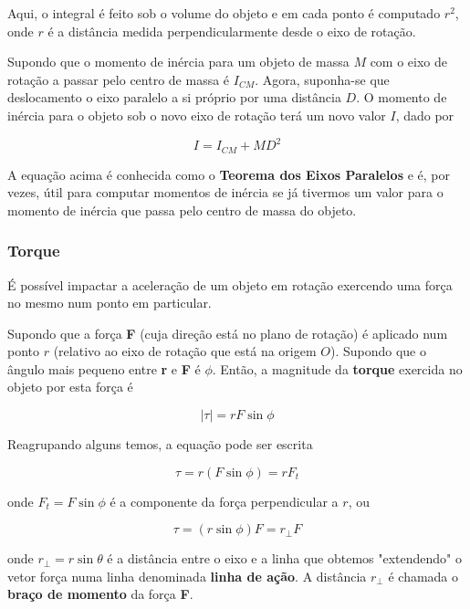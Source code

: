 Aqui, o integral é feito sob o volume do objeto e em cada ponto é computado $r^2$, onde $r$ é a distância medida perpendicularmente desde o eixo de rotação.

Supondo que o momento de inércia para um objeto de massa $M$ com o eixo de rotação a passar pelo centro de massa é $I_{CM}$. Agora, suponha-se que deslocamento o eixo paralelo a si próprio por uma distância $D$. O momento de inércia para o objeto sob o novo eixo de rotação terá um novo valor $I$, dado por

\begin{equation}
    I=I_{CM}+MD^2
\end{equation}

A equação acima é conhecida como o \textbf{Teorema dos Eixos Paralelos} e é, por vezes, útil para computar momentos de inércia se já tivermos um valor para o momento de inércia que passa pelo centro de massa do objeto.

\subsubsection{Torque}
É possível impactar a aceleração de um objeto em rotação exercendo uma força no mesmo num ponto em particular.

Supondo que a força \textbf{F} (cuja direção está no plano de rotação) é aplicado num ponto $r$ (relativo ao eixo de rotação que está na origem $O$). Supondo que o ângulo mais pequeno entre \textbf{r} e \textbf{F} é $\phi$. Então, a magnitude da \textbf{torque} exercida no objeto por esta força é

\begin{equation}
    |\tau|=rF\sin \phi
\end{equation}

Reagrupando alguns temos, a equação pode ser escrita

\begin{equation*}
    \tau=r(F\sin \phi)=rF_t
\end{equation*}

onde $F_t=F\sin \phi$ é a componente da força perpendicular a $r$, ou

\begin{equation*}
    \tau=(r\sin \phi)F=r_{\perp}F
\end{equation*}

onde $r_{\perp}=r\sin \theta$ é a distância entre o eixo e a linha que obtemos "extendendo" o vetor força numa linha denominada \textbf{linha de ação}. A distância $r_{\perp}$ é chamada o \textbf{braço de momento} da força \textbf{F}. 

